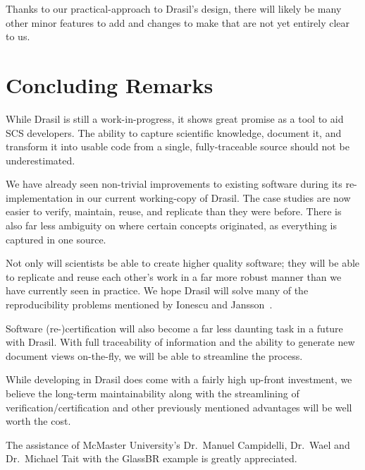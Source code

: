 \documentclass[sigconf]{acmart}
\begin{document}
Thanks to our practical-approach to Drasil's design, there will likely be many 
other minor features to add and changes to make that are not yet entirely clear 
to us.

\section{Concluding Remarks}

While Drasil is still a work-in-progress, it shows great promise as a tool to 
aid SCS developers. The ability to capture scientific knowledge, document it, 
and transform it into usable code from a single, fully-traceable source should 
not be underestimated.

We have already seen non-trivial improvements to existing software during its 
re-implementation in our current working-copy of Drasil. The case studies are 
now easier to verify, maintain, reuse, and replicate than they were before. 
There is also far less ambiguity on where certain concepts originated, as 
everything is captured in one source.

Not only will scientists be able to create higher quality software; they will 
be able to replicate and reuse each other's work in a far more robust manner 
than we have currently seen in practice. We hope Drasil will solve many of the 
reproducibility problems mentioned by Ionescu and 
Jansson~\cite{IonescuAndJansson2013}.

Software (re-)certification will also become a far less daunting task in a
future with Drasil. With full traceability of information and the ability to 
generate new document views on-the-fly, we will be able to streamline the 
process.

While developing in Drasil does come with a fairly high up-front investment, we 
believe the long-term maintainability along with the streamlining of 
verification/certification and other previously mentioned advantages 
will be well worth the cost.

\begin{acks}
The assistance of McMaster University's Dr.\ Manuel Campidelli, Dr.\ Wael and
Dr.\ Michael Tait with the GlassBR example is greatly appreciated.
\end{acks}


 
\end{document}
